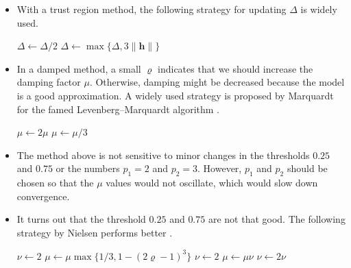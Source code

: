\documentclass[10pt]{article}
\newcommand{\ve}[1]{\mathbf{#1}}
\begin{document}
\begin{itemize}
    \item With a trust region method, the following strategy for updating $\Delta$ is widely used.
    \medskip
    \begin{algorithmic}
            \State $\Delta \gets \Delta / 2$
        \Else
            \State $\Delta \gets \max\{ \Delta, 3 \| \ve{h} \| \}$
        \EndIf
    \end{algorithmic}

    \item In a damped method, a small $\varrho$ indicates that we should increase the damping factor $\mu$. Otherwise, damping might be decreased because the model is a good approximation. A widely used strategy is proposed by Marquardt for the famed Levenberg--Marquardt algorithm \cite{Marquadrt:1963}.
    \medskip
    \begin{algorithmic}
            \State $\mu \gets 2 \mu$        
        \EndIf
            \State $\mu \gets \mu / 3$
        \EndIf
    \end{algorithmic}

    \item The method above is not sensitive to minor changes in the thresholds $0.25$ and $0.75$ or the numbers $p_1 = 2$ and $p_2 = 3$. However, $p_1$ and $p_2$ should be chosen so that the $\mu$ values would not oscillate, which would slow down convergence.
    
    \pagebreak
    
    \item It turns out that the threshold $0.25$ and $0.75$ are not that good. The following strategy by Nielsen performs better \cite{Nielsen:1999}.
    \begin{algorithmic}
        \State $\nu \gets 2$
            \State $\mu \gets \mu \max\{ 1/3, 1 - (2\varrho-1)^3\}$
            \State $\nu \gets 2$
        \Else
            \State $\mu \gets \mu \nu$
            \State $\nu \gets 2\nu$
        \EndIf
    \end{algorithmic}


\end{itemize}
\end{document}
